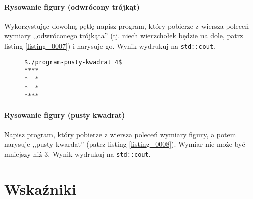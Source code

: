 \documentclass[11pt,a4paper,titlepage,onecolumn]{article}
\begin{document}
\paragraph{Rysowanie figury (odwrócony trójkąt)} Wykorzystując dowolną pętlę
napisz program, który pobierze z wiersza poleceń wymiary ,,odwróconego
trójkąta'' (tj.  niech wierzchołek będzie na dole, patrz listing
\ref{listing_0007}) i narysuje go. Wynik wydrukuj na \texttt{std::cout}.

\begin{figure}
\begin{lstlisting}[caption={pusty kwardat},
    captionpos=b,
    label=listing_0008]
$./program-pusty-kwadrat 4$
****
*  *
*  *
****
\end{lstlisting}
\end{figure}

\paragraph{Rysowanie figury (pusty kwadrat)} Napisz program, który pobierze z
wiersza poleceń wymiary figury, a potem narysuje ,,pusty kwardat'' (patrz
listing \ref{listing_0008}). Wymiar nie może być mniejszy niż 3.
Wynik wydrukuj na \texttt{std::cout}.

\newpage
\section{Wskaźniki}



% 

% 

% 


% 

% 
\end{document}

